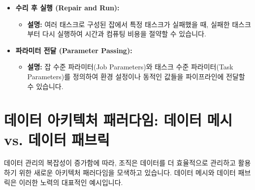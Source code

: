 \documentclass[11pt,a4paper]{article}
\theoremstyle{definition}
\begin{document}
\begin{tcolorbox}[title=\textbf{Databricks Jobs의 주요 기능}, colback=blue!5!white, colframe=blue!75!black, sharp corners, boxrule=0.8pt]
\begin{itemize}
\begin{itemize}
    \end{itemize}
    \item \textbf{수리 후 실행 (Repair and Run):}
    \begin{itemize}
        \item \textbf{설명:} 여러 태스크로 구성된 잡에서 특정 태스크가 실패했을 때, 실패한 태스크부터 다시 실행하여 시간과 컴퓨팅 비용을 절약할 수 있습니다.
    \end{itemize}
    \item \textbf{파라미터 전달 (Parameter Passing):}
    \begin{itemize}
        \item \textbf{설명:} 잡 수준 파라미터(Job Parameters)와 태스크 수준 파라미터(Task Parameters)를 정의하여 환경 설정이나 동적인 값들을 파이프라인에 전달할 수 있습니다.
    \end{itemize}
\end{itemize}
\end{tcolorbox}

\newpage
\section{데이터 아키텍처 패러다임: 데이터 메시 vs. 데이터 패브릭}

데이터 관리의 복잡성이 증가함에 따라, 조직은 데이터를 더 효율적으로 관리하고 활용하기 위한 새로운 아키텍처 패러다임을 모색하고 있습니다. 데이터 메시와 데이터 패브릭은 이러한 노력의 대표적인 예시입니다.
\end{document}
